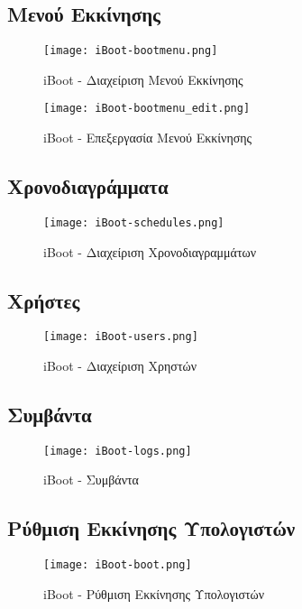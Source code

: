 \subsection{Μενού Εκκίνησης}
\FloatBarrier
\begin{figure}[ht]
	\centering
	\texttt{[image: iBoot-bootmenu.png]}
	\caption{iBoot - Διαχείριση Μενού Εκκίνησης}
	\label{fig:iBoot_bootmenu}
\end{figure}

\begin{figure}[ht]
	\centering
	\texttt{[image: iBoot-bootmenu\_edit.png]}
	\caption{iBoot - Επεξεργασία Μενού Εκκίνησης}
	\label{fig:iBoot_bootmenu_edit}
\end{figure}
\FloatBarrier

\subsection{Χρονοδιαγράμματα}
\FloatBarrier
\begin{figure}[ht]
	\centering
	\texttt{[image: iBoot-schedules.png]}
	\caption{iBoot - Διαχείριση Χρονοδιαγραμμάτων}
	\label{fig:iBoot_schedules}
\end{figure}
\FloatBarrier

\subsection{Χρήστες}
\FloatBarrier
\begin{figure}[ht]
	\centering
	\texttt{[image: iBoot-users.png]}
	\caption{iBoot - Διαχείριση Χρηστών}
	\label{fig:iBoot_users}
\end{figure}
\FloatBarrier

\subsection{Συμβάντα}
\FloatBarrier
\begin{figure}[ht]
	\centering
	\texttt{[image: iBoot-logs.png]}
	\caption{iBoot - Συμβάντα}
	\label{fig:iBoot_logs}
\end{figure}
\FloatBarrier

\subsection{Ρύθμιση Εκκίνησης Υπολογιστών}
\FloatBarrier
\begin{figure}[ht]
	\centering
	\texttt{[image: iBoot-boot.png]}
	\caption{iBoot - Ρύθμιση Εκκίνησης Υπολογιστών}
	\label{fig:iBoot_boot}
\end{figure}
\FloatBarrier

